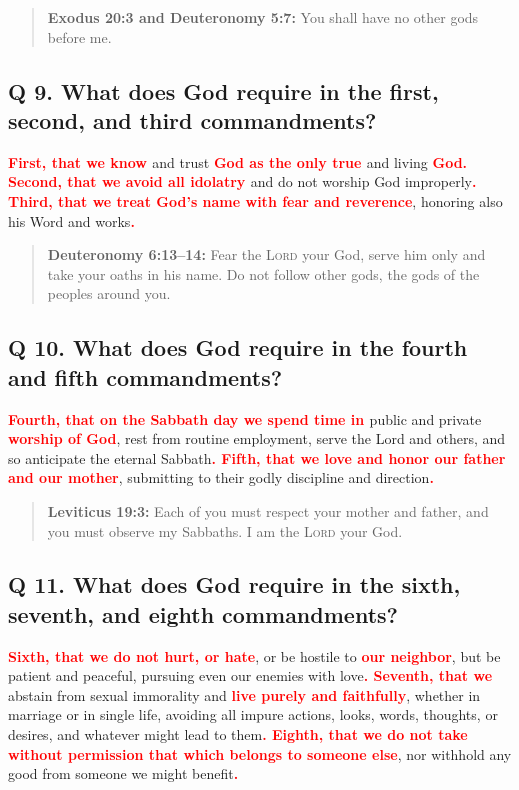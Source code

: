\documentclass[titlepage]{memoir}
\newcommand\Children[1]{\textbf{\textcolor{red}{#1}}}
\newcommand\Quote[2]{\begin{quote}{\small\textbf{#1:}{ #2}}\end{quote}}
\begin{document}
\Quote{Exodus 20:3 and Deuteronomy 5:7\index[deu]{05:7@5:7}}{You shall have no other gods before me.}

\subsection{Q 9. What does God require in the first, second, and third commandments?}
\Children{First, that we know }and trust \Children{God as the only true }and living \Children{God. Second, that we avoid all idolatry }and do not worship God improperly\Children{. Third, that we treat God's name with fear and reverence}, honoring also his Word and works\Children{.}

\Quote{Deuteronomy 6:13--14}{Fear the \textsc{Lord} your God, serve him only and take your oaths in his name. Do not follow other gods, the gods of the peoples around you.}

\subsection{Q 10. What does God require in the fourth and fifth commandments?}
\Children{Fourth, that on the Sabbath day we spend time in }public and private \Children{worship of God}, rest from routine employment, serve the Lord and others, and so anticipate the eternal Sabbath\Children{. Fifth, that we love and honor our father and our mother}, submitting to their godly discipline and direction\Children{.}

\Quote{Leviticus 19:3}{Each of you must respect your mother and father, and you must observe my Sabbaths. I am the \textsc{Lord} your God.}

\subsection{Q 11. What does God require in the sixth, seventh, and eighth commandments?}
\Children{Sixth, that we do not hurt, or hate}, or be hostile to \Children{ our neighbor}, but be patient and peaceful, pursuing even our enemies with love\Children{. Seventh, that we }abstain from sexual immorality and \Children{live purely and faithfully}, whether in marriage or in single life, avoiding all impure actions, looks, words, thoughts, or desires, and whatever might lead to them\Children{. Eighth, that we do not take without permission that which belongs to someone else}, nor withhold any good from someone we might benefit\Children{.}
\end{document}
